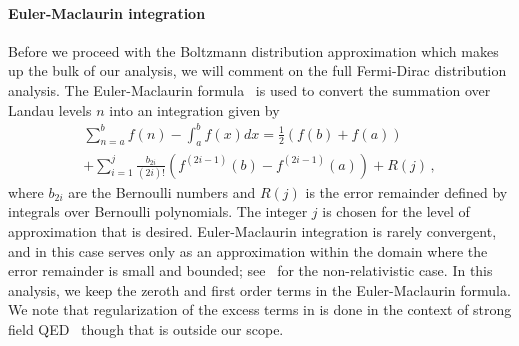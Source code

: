\paragraph{Euler-Maclaurin integration}
\label{sec:eulermac}
\noindent Before we proceed with the Boltzmann distribution approximation which makes up the bulk of our analysis, we will comment on the full Fermi-Dirac distribution analysis. The Euler-Maclaurin formula~\cite{abramowitz1988handbook} is used to convert the summation over Landau levels $n$ into an integration given by
\begin{multline}
    \label{eulermaclaurin}\sum^{b}_{n=a}f(n)-\int^{b}_{a}f(x)dx = \frac{1}{2}\left(f(b)+f(a)\right)\\
    +\sum_{i=1}^{j}\frac{b_{2i}}{(2i)!}\left(f^{(2i-1)}(b)-f^{(2i-1)}(a)\right)+R(j)\,,
\end{multline}
where $b_{2i}$ are the Bernoulli numbers and $R(j)$ is the error remainder defined by integrals over Bernoulli polynomials. The integer $j$ is chosen for the level of approximation that is desired. Euler-Maclaurin integration is rarely convergent, and in this case serves only as an approximation within the domain where the error remainder is small and bounded; see~\cite{greiner2012thermodynamics} for the non-relativistic case. In this analysis, we keep the zeroth and first order terms in the Euler-Maclaurin formula. We note that regularization of the excess terms in  is done in the context of strong field QED~\cite{greiner2008quantum} though that is outside our scope.

